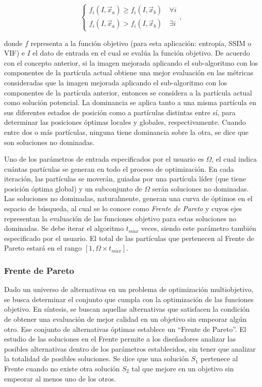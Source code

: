 \documentclass[sigplan,screen]{acmart}
\begin{document}
\begin{equation}
    \begin{cases}
        f_i(I,\vec{x}_a)\geq f_i(I,\vec{x}_b)\quad\forall i\\
        f_i(I,\vec{x}_a)>f_i(I,\vec{x}_b)\quad\exists i
    \end{cases},
\label{eq:eq3}
\end{equation}


\noindent donde $f$ representa a la función objetivo (para esta aplicación: entropía, SSIM o VIF) e $I$ el dato de entrada en el cual se evalúa la función objetivo. De acuerdo con el concepto anterior, si la imagen mejorada aplicando el sub-algoritmo con los componentes de la partícula actual obtiene una mejor evaluación en las métricas consideradas que la imagen mejorada aplicando el sub-algoritmo con los componentes de la partícula anterior, entonces se considera a la partícula actual como solución potencial. La dominancia se aplica tanto a una misma partícula en sus diferentes estados de posición como a partículas distintas entre sí, para determinar las posiciones óptimas locales y globales, respectivamente. Cuando entre dos o más partículas, ninguna tiene dominancia sobre la otra, se dice que son soluciones no dominadas.\par
Uno de los parámetros de entrada especificados por el usuario es $\Omega$, el cual indica cuántas partículas se generan en todo el proceso de optimización. En cada iteración, las partículas se moverán, guiadas por una partícula líder (que tiene posición óptima global) y un subconjunto de $\Omega$ serán soluciones no dominadas. Las soluciones no dominadas, naturalmente, generan una curva de óptimos en el espacio de búsqueda, al cual se lo conoce como \textit{Frente de Pareto} y cuyos ejes representan la evaluación de las funciones objetivo para estas soluciones no dominadas. Se debe iterar el algoritmo $t_{m\acute{a}x}$ veces, siendo este parámetro también especificado por el usuario. El total de las partículas que pertenecen al Frente de Pareto estará en el rango $[1,\Omega \times t_{m\acute{a}x}]$.


\subsubsection{Frente de Pareto}
Dado un universo de alternativas en un problema de optimización multiobjetivo, se busca determinar el conjunto que cumpla con la optimización de las funciones objetivo. En síntesis, se buscan aquellas alternativas que satisfacen la condición de obtener una evaluación de mejor calidad en un objetivo sin empeorar algún otro. Ese conjunto de alternativas óptimas establece un “Frente de Pareto”. El estudio de las soluciones en el Frente permite a los diseñadores analizar las posibles alternativas dentro de los parámetros establecidos, sin tener que analizar la totalidad de posibles soluciones. Se dice que una solución $S_1$ pertenece al Frente cuando no existe otra solución $S_2$ tal que mejore en un objetivo sin empeorar al menos uno de los otros.
\end{document}
